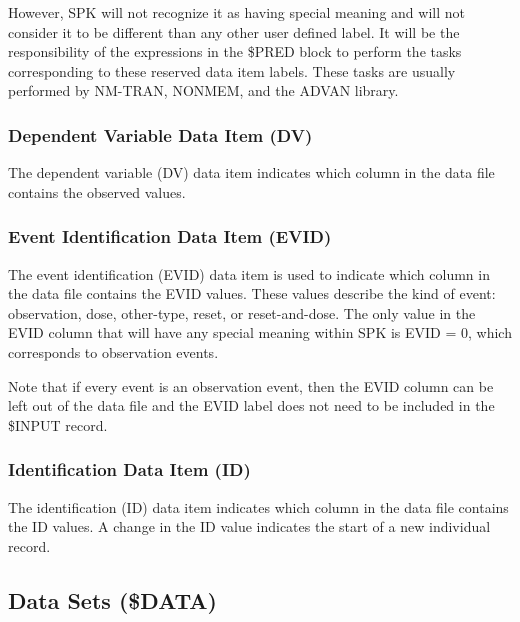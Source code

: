 \documentclass{article}
\begin{document}
However, SPK will not recognize it as having special meaning and will
not consider it to be different than any other user defined label.
It will be the responsibility of the expressions in the \$PRED block to 
perform the tasks corresponding to these reserved data item labels.
These tasks are usually performed by NM-TRAN, NONMEM, and the
ADVAN library.


\subsubsection{Dependent Variable Data Item (DV)}

The dependent variable (DV) data item indicates which column in 
the data file contains the observed values.


\subsubsection{Event Identification Data Item (EVID)}

The event identification (EVID) data item is used to indicate which
column in the data file contains the EVID values.
These values describe the kind of event: observation, dose, 
other-type, reset, or reset-and-dose.
The only value in the EVID column that will have any special meaning
within SPK is EVID = 0, which corresponds to observation events.

Note that if every event is an observation event, then
the EVID column can be left out of the data file and the EVID label
does not need to be included in the \$INPUT record.


\subsubsection{Identification Data Item (ID)}

The identification (ID) data item indicates which column in 
the data file contains the ID values.
A change in the ID value indicates the start of a new
individual record.


\subsection{Data Sets (\$DATA)}
\end{document}
